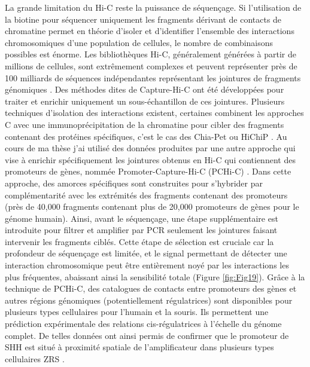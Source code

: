 La grande limitation du \acrshort{Hi-C} reste la puissance de séquençage. Si l’utilisation de la biotine pour séquencer uniquement les fragments dérivant de contacts de chromatine permet en théorie d’isoler et d’identifier l’ensemble des interactions chromosomiques d’une population de cellules, le nombre de combinaisons possibles est énorme. Les bibliothèques \acrshort{Hi-C}, généralement générées à partir de millions de cellules, sont extrêmement complexes et peuvent représenter près de 100 milliards de séquences indépendantes représentant les jointures de fragments génomiques \citep{belton_hic_2012}. Des méthodes dites de Capture-\acrshort{Hi-C} ont été développées pour traiter et enrichir uniquement un sous-échantillon de ces jointures. Plusieurs techniques d’isolation des interactions existent, certaines combinent les approches C avec une immunoprécipitation de la chromatine pour cibler des fragments contenant des protéines spécifiques, c’est le cas des Chia-Pet ou HiChiP \citep{fullwood_chip-based_2009}. Au cours de ma thèse j’ai utilisé des données produites par une autre approche qui vise à enrichir spécifiquement les jointures obtenus en \acrshort{Hi-C} qui contiennent des promoteurs de gènes, nommée Promoter-Capture-\acrshort{Hi-C} (\acrshort{PCHi-C}) \citep{schoenfelder_pluripotent_2015}. Dans cette approche, des amorces spécifiques sont construites pour s’hybrider par complémentarité avec les extrémités des fragments contenant des promoteurs (près de 40,000 fragments contenant plus de 20,000 promoteurs de gènes pour le génome humain). Ainsi, avant le séquençage, une étape supplémentaire est introduite pour filtrer et amplifier par PCR seulement les jointures faisant intervenir les fragments ciblés. Cette étape de sélection est cruciale car la profondeur de séquençage est limitée, et le signal permettant de détecter une interaction chromosomique peut être entièrement noyé par les interactions les plus fréquentes, abaissant ainsi la sensibilité totale (Figure \ref{fig:Fig19}). Grâce à la technique de \acrshort{PCHi-C}, des catalogues de contacts entre promoteurs des gènes et autres régions génomiques (potentiellement régulatrices) sont disponibles pour plusieurs types cellulaires pour l’humain et la souris. Ils permettent une prédiction expérimentale des relations \gls{cis}-régulatrices à l’échelle du génome complet. De telles données ont ainsi permis de confirmer que le promoteur de \acrshort{SHH} est situé à proximité spatiale de l’\gls{amplificateur} dans plusieurs types cellulaires \acrshort{ZRS} \citep{javierre_lineage-specific_2016, laverre_long-range_2022}. \\

